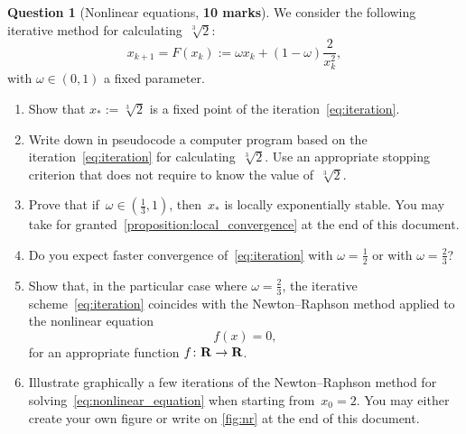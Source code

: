 \documentclass[11pt]{article}
\theoremstyle{definition}
\newtheorem{question}{Question}
\theoremstyle{remark}
\theoremstyle{plain}%
\begin{document}
\newpage
\begin{question}
    [Nonlinear equations, \textbf{10 marks}]
    We consider the following iterative method for calculating~$\sqrt[3]{2}$:
    \begin{equation}
        \label{eq:iteration}
        x_{k+1} = F(x_k) :=  \omega x_k + (1 - \omega) \frac{2}{x_k^2},
    \end{equation}
    with $\omega \in (0, 1)$ a fixed parameter.
    \begin{enumerate}
        \item
            \mymark
            Show that $x_* := \sqrt[3]{2}$ is a fixed point of the iteration~\eqref{eq:iteration}.

        \item
            Write down in pseudocode a computer program based on the iteration~\eqref{eq:iteration} for calculating~$\sqrt[3]{2}$.
            Use an appropriate stopping criterion that does not require to know the value of~$\sqrt[3]{2}$.

        \item
            Prove that if~$\omega \in \left(\frac{1}{3}, 1\right)$,
            then~$x_*$ is locally exponentially stable.
            You may take for granted~\cref{proposition:local_convergence} at the end of this document.

        \item
            \mymark
            Do you expect faster convergence of~\eqref{eq:iteration} with $\omega = \frac{1}{2}$ or with $\omega = \frac{2}{3}$?

        \item
            Show that, in the particular case where $\omega = \frac{2}{3}$,
            the iterative scheme~\eqref{eq:iteration} coincides with the Newton--Raphson method applied to
            the nonlinear equation
            \begin{equation}
                \label{eq:nonlinear_equation}
                f(x) = 0,
            \end{equation}
            for an appropriate function $f \colon \mathbf R \to \mathbf R$.

        \item
            Illustrate graphically a few iterations of the Newton--Raphson method for solving~\eqref{eq:nonlinear_equation} when starting from~$x_0 = 2$.
            You may either create your own figure or write on \cref{fig:nr} at the end of this document.


\end{enumerate}
\end{question}
\end{document}
